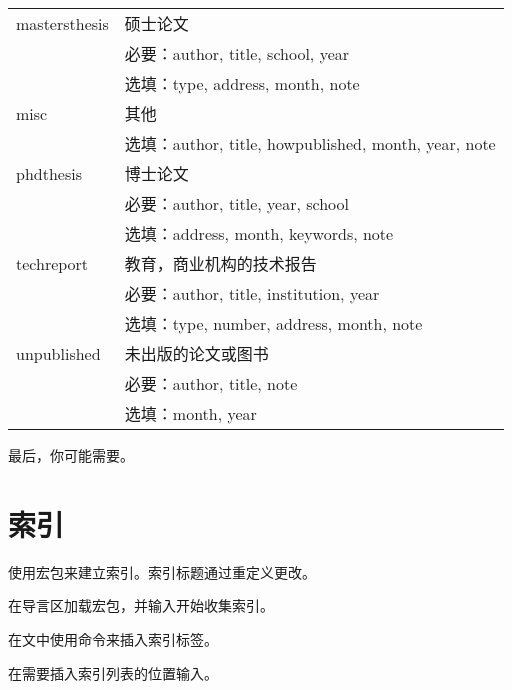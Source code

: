 \begin{table}[!htb]
\begin{tabular}{>{\ttfamily}ll}
\hline
mastersthesis & 硕士论文\\
& 必要：author, title, school, year \\
& 选填：type, address, month, note\\
\hline
misc & 其他 \\
& 选填：author, title, howpublished, month, year, note \\
\hline
phdthesis & 博士论文 \\
& 必要：author, title, year, school\\
& 选填：address, month, keywords, note\\
\hline
techreport & 教育，商业机构的技术报告\\
& 必要：author, title, institution, year\\
& 选填：type, number, address, month, note\\
\hline
unpublished & 未出版的论文或图书\\
& 必要：author, title, note\\
& 选填：month, year\\
\hline
\end{tabular}
\end{table}

最后，你可能需要。

\section{索引}
使用宏包来建立索引。索引标题通过重定义更改。
\begin{feae}
\item 在导言区加载宏包，并输入开始收集索引。
\item 在文中使用命令来插入索引标签。
\item 在需要插入索引列表的位置输入。
\end{feae}


